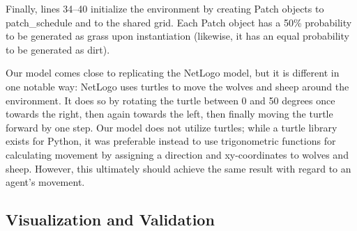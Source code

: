         Finally, lines 34--40 initialize the environment by creating Patch objects
        to patch\_schedule and to the shared grid.
        Each Patch object has a 50\% probability to be generated as grass upon
        instantiation (likewise, it has an equal probability to be generated as dirt).

        Our model comes close to replicating the NetLogo model,
        but it is different in one notable way: NetLogo uses turtles to move the wolves
        and sheep around the environment.
        It does so by rotating the turtle between 0 and 50 degrees once towards the
        right, then again towards the left, then finally moving the turtle
        forward by one step.
        Our model does not utilize turtles;
        while a turtle library exists for Python,
        it was preferable instead to use trigonometric functions for calculating
        movement by assigning a direction and xy-coordinates to wolves and sheep.
        However, this ultimately should achieve the same result with regard to an
        agent's movement.

    \subsection{Visualization and Validation}
        \label{subsec:visualization-and-validation}
